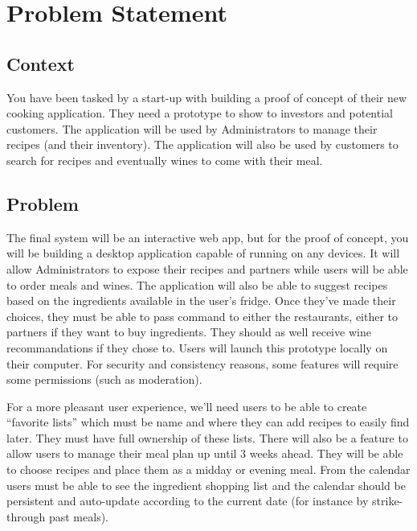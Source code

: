 \documentclass[english,12pt,twoside,a4paper]{article}
\begin{document}
\setlength{\columnsep}{1cm}
\tableofcontents
\clearpage

\hypersetup{linkcolor=red}

\section{Problem Statement}
\subsection{Context}
You have been tasked by a start-up with building a proof of concept of their new cooking application. They need a prototype to show to investors and potential customers. The application will be used by Administrators to manage their recipes (and their inventory). The application will also be used by customers to search for recipes and eventually wines to come with their meal.
\subsection{Problem}
The final system will be an interactive web app, but for the proof of concept, you will be building a desktop application capable of running on any devices. It will allow Administrators to expose their recipes and partners while users will be able to order meals and wines. The application will also be able to suggest recipes based on the ingredients available in the user's fridge. Once they’ve made their choices, they must be able to pass command to either the restaurants, either to partners if they want to buy ingredients. They should as well receive wine recommandations if they chose to. Users will launch this prototype locally on their computer. For security and consistency reasons, some features will require some permissions (such as moderation).

For a more pleasant user experience, we’ll need users to be able to create “favorite lists” which must be name and where they can add recipes to easily find later. They must have full ownership of these lists. There will also be a feature to allow users to manage their meal plan up until 3 weeks ahead. They will be able to choose recipes and place them as a midday or evening meal. From the calendar users must be able to see the ingredient shopping list and the calendar should be persistent and auto-update according to the current date (for instance by strike-through past meals).
\end{document}
